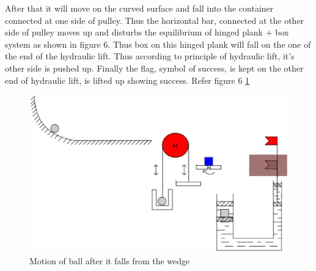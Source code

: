 \documentclass[a4paper,11pt]{article}
\begin{document}
{\indent After that it will move on the curved surface and fall into the container connected at one side of pulley.  
\indent Thus the horizontal bar, connected at the other side of pulley moves up and disturbs the equilibrium of hinged plank + box system as shown in figure 6. Thus box on this hinged plank will fall on the one of the end of the hydraulic lift. Thus according to principle of hydraulic lift, it's other side is pushed up. Finally the flag, symbol of success, is kept on the other end of hydraulic lift, is lifted up showing success. Refer figure 6 \ref{fig:image3}
\begin{figure}[h]
    \centering
    \label{fig:image3}
    \includegraphics[scale=0.3]{images/image3}
    \caption{Motion of ball after it falls from the wedge}
\end{figure}

}

\newpage
\end{document}
